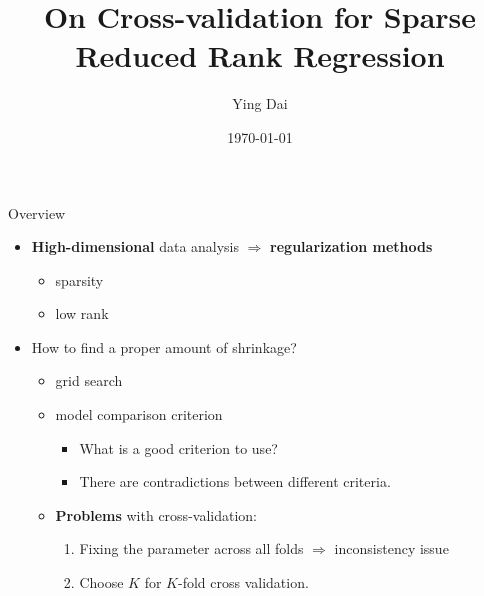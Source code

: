 \documentclass{beamer}
\title{On Cross-validation for Sparse Reduced Rank Regression}
\author{Ying Dai}
\institute{Journal Club, Oregon State University}
\date{\today}
\begin{document}
\frame{\titlepage}

\begin{frame}{Overview}
    \begin{itemize}
        \item \textbf{High-dimensional} data analysis $\Rightarrow$
        \textbf{regularization methods}
        \begin{itemize}
            \item sparsity
            \item low rank
        \end{itemize}
        \item How to find a proper amount of shrinkage?
        \begin{itemize}
            \item grid search
            \item model comparison criterion
            \begin{itemize}
                \item What is a good criterion to use?
                \item There are contradictions between different criteria.
            \end{itemize}
        \end{itemize}
        \begin{itemize}
            \item \textbf{Problems} with cross-validation:
            \begin{enumerate}
                \item Fixing the parameter across all folds $\Rightarrow$ inconsistency issue
                \item Choose $K$ for $K$-fold cross validation.
            \end{enumerate}
        \end{itemize}
    \end{itemize}
\end{frame}


\end{document}
